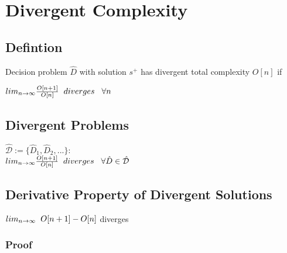 \documentclass[11pt]{article}
\begin{document}
\section{Divergent Complexity}
\subsection{Defintion}
Decision problem $\hat{D}$ with solution $s^+$ has divergent total complexity $O[n]$ if
\begin{center}
$
lim_{n \rightarrow \infty} \frac{O[n+1]}{O[n]} \hspace{2mm} diverges \hspace{3mm} \forall n
$
\end{center}




\subsection{Divergent Problems}
\begin{center}
$
\mathcal{\hat{D}} := \{ \hat{D}_1,\hat{D}_2,...\} :
$
\\ \vspace{2mm}
$
lim_{n \rightarrow \infty} \frac{O[n+1]}{O[n]} \hspace{2mm} diverges \hspace{3mm} \forall \hat{D} \in \mathcal{\hat{D}}
$
\end{center}





\subsection{Derivative Property of Divergent Solutions}
\begin{center}
$
lim_{n \rightarrow \infty} \hspace{2mm} O[n+1] - O[n]$ diverges
\end{center}

\subsubsection{Proof}




\end{document}

